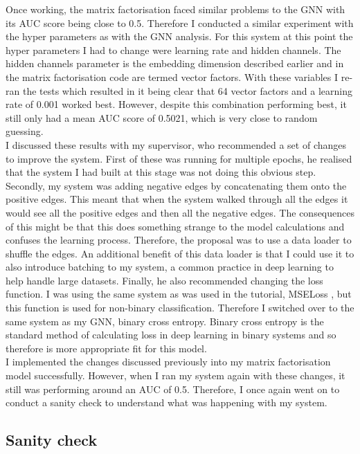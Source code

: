 \documentclass{l4proj}
\begin{document}
Once working, the matrix factorisation faced similar problems to the GNN with its AUC score being close to 0.5. Therefore I conducted a similar experiment with the hyper parameters as with the GNN analysis. For this system at this point the hyper parameters I had to change were learning rate and hidden channels. The hidden channels parameter is the embedding dimension described earlier and in the matrix factorisation code are termed vector factors. With these variables I re-ran the tests which resulted in it being clear that 64 vector factors and a learning rate of 0.001 worked best. However, despite this combination performing best, it still only had a mean AUC score of 0.5021, which is very close to random guessing. \\

I discussed these results with my supervisor, who recommended a set of changes to improve the system. First of these was running for multiple epochs, he realised that the system I had built at this stage was not doing this obvious step. Secondly, my system was adding negative edges by concatenating them onto the positive edges. This meant that when the system walked through all the edges it would see all the positive edges and then all the negative edges. The consequences of this might be that this does something strange to the model calculations and confuses the learning process. Therefore, the proposal was to use a data loader to shuffle the edges. An additional benefit of this data loader is that I could use it to also introduce batching to my system, a common practice in deep learning to help handle large datasets. Finally, he also recommended changing the loss function. I was using the same system as was used in the tutorial, MSELoss \citep{mseloss}, but this function is used for non-binary classification. Therefore I switched over to the same system as my GNN, binary cross entropy. Binary cross entropy is the standard method of calculating loss in deep learning in binary systems and so therefore is more appropriate fit for this model.\\

I implemented the changes discussed previously into my matrix factorisation model successfully. However, when I ran my system again with these changes, it still was performing around an AUC of 0.5. Therefore, I once again went on to conduct a sanity check to understand what was happening with my system. \\

\subsection{Sanity check}
\end{document}
